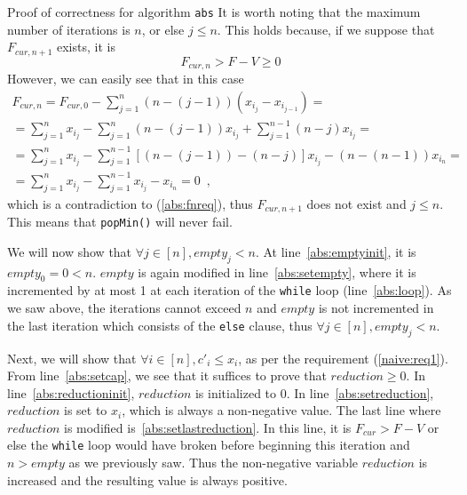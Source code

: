 \begin{sepproof}{Proof of correctness for algorithm \texttt{abs}}
  It is worth noting that the maximum number of iterations is $n$, or else $j \leq n$. This holds because, if we suppose that
  $F_{cur, n+1}$ exists, it is
  \begin{equation}
  \label{abs:fnreq}
    F_{cur, n} > F - V \geq 0
  \end{equation}
  However, we can easily see that in this case
  \begin{equation*}
  \begin{gathered}
    F_{cur, n} = F_{cur, 0} - \sum\limits_{j=1}^n\left(n - \left(j-1\right)\right)\left(x_{i_j} - x_{i_{j-1}}\right) = \\
    = \sum\limits_{j=1}^nx_{i_j} - \sum\limits_{j=1}^n\left(n - \left(j - 1\right)\right)x_{i_j} +
    \sum\limits_{j=1}^{n-1}\left(n - j\right)x_{i_j} = \\
    = \sum\limits_{j=1}^nx_{i_j} - \sum\limits_{j=1}^{n-1}[\left(n - \left(j - 1\right)\right) - \left(n - j\right)]x_{i_j}
    - \left(n - \left(n - 1\right)\right)x_{i_n} = \\
    = \sum\limits_{j=1}^nx_{i_j} - \sum\limits_{j=1}^{n-1}x_{i_j} - x_{i_n} = 0\enspace,
  \end{gathered}
  \end{equation*}
  which is a contradiction to (\ref{abs:fnreq}), thus $F_{cur, n+1}$ does not exist and $j \leq n$. This means
  that \texttt{popMin()} will never fail.

  We will now show that $\forall j \in [n], empty_j < n$. At line~\ref{abs:emptyinit}, it is $empty_0 = 0 < n$. $empty$
  is again modified in line~\ref{abs:setempty}, where it is incremented by at most 1 at each iteration of the \texttt{while}
  loop (line~\ref{abs:loop}). As we saw above, the iterations cannot exceed $n$ and $empty$ is not incremented in the last
  iteration which consists of the \texttt{else} clause, thus $\forall j \in [n], empty_j < n$.

  Next, we will show that $\forall i \in [n], c'_i \leq x_i$, as per the requirement (\ref{naive:req1}). From
  line~\ref{abs:setcap}, we see that it suffices to prove that $reduction \geq 0$. In line~\ref{abs:reductioninit},
  $reduction$ is initialized to 0. In line~\ref{abs:setreduction}, $reduction$ is set to $x_i$, which is always
  a non-negative value. The last line where $reduction$ is modified is~\ref{abs:setlastreduction}. In this line, it is
  $F_{cur} > F - V$ or else the \texttt{while} loop would have broken before beginning this iteration and $n > empty$ as we
  previously saw. Thus the non-negative variable $reduction$ is increased and the resulting value is always positive.


\end{sepproof}

